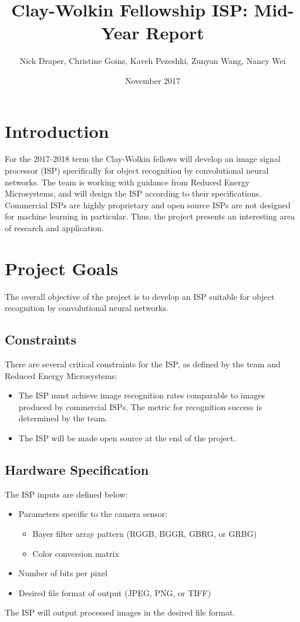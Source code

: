 \documentclass{report}
\begin{document}
\title{Clay-Wolkin Fellowship ISP: Mid-Year Report}
\author{Nick Draper, Christine Goins, Kaveh Pezeshki, Zunyan Wang, Nancy Wei}
\date{November 2017}
\maketitle

\tableofcontents
\listoffigures
\listoftables

\begin{abstract}
	\label{abstract}
\end{abstract}

\chapter{Introduction}
	For the 2017-2018 term the Clay-Wolkin fellows will develop an image signal processor (ISP) specifically for object recognition by convolutional neural networks. The team is working with guidance from Reduced Energy Microsystems, and will design the ISP according to their specifications. Commercial ISPs are highly proprietary and open source ISPs are not designed for machine learning in particular. Thus, the project presents an interesting area of research and application. 
\chapter{Project Goals}
	The overall objective of the project is to develop an ISP suitable for object recognition by convolutional neural networks.
	\section{Constraints}
	There are several critical constraints for the ISP, as defined by the team and Reduced Energy Microsystems:
	\begin{itemize}
		\item The ISP must achieve image recognition rates comparable to images produced by commercial ISPs. The metric for recognition success is determined by the team. 
		\item The ISP will be made open source at the end of the project.
	\end{itemize}
	\section{Hardware Specification}
	The ISP inputs are defined below:
	\begin{itemize}
		\item Parameters specific to the camera sensor:
		\begin{itemize}
			\item Bayer filter array pattern (RGGB, BGGR, GBRG, or GRBG)
			\item Color conversion matrix 
		\end{itemize}
		\item Number of bits per pixel
		\item Desired file format of output (JPEG, PNG, or TIFF)
	\end{itemize}
	The ISP will output processed images in the desired file format. 
	
\end{document}
